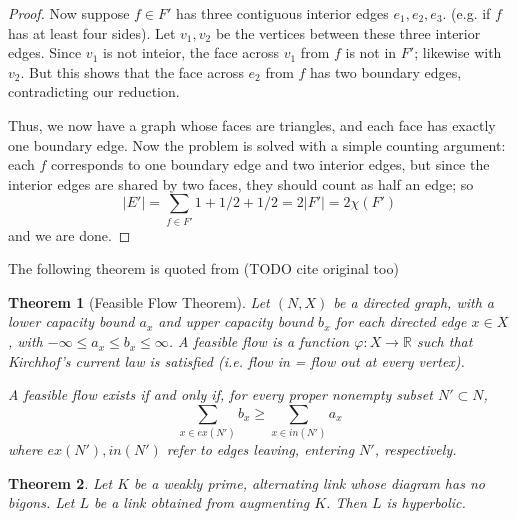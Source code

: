 \documentclass[11pt]{amsart}
\newcommand{\figref}[1]{Figure \ref{#1}}
\newcommand{\RR}{\mathbb{R}}
\newcommand{\vphi}{\varphi}
\theoremstyle{plain}
\newtheorem{theorem}{Theorem}[section]
\theoremstyle{definition}
\begin{document}
\begin{proof}
Now suppose $f\in F'$ has three contiguous interior edges
$e_1,e_2,e_3$.
(e.g. if $f$ has at least four sides).
Let $v_1, v_2$ be the vertices between these three interior edges.
Since $v_1$ is not inteior,
the face across $v_1$ from $f$ is not in $F'$;
likewise with $v_2$.
But this shows that the face across $e_2$ from $f$
has two boundary edges, contradicting our reduction.


Thus, we now have a graph whose faces are triangles,
and each face has exactly one boundary edge.
Now the problem is solved with a simple counting argument:
each $f$ corresponds to one boundary edge and two interior edges,
but since the interior edges are shared by two faces,
they should count as half an edge; so
\[
 |E'| = \sum_{f\in F'} 1 + 1/2 + 1/2 = 2|F'| = 2\chi(F')
\]
and we are done.
\end{proof}


The following theorem is quoted from \cite{BS}
(TODO cite original too)

\begin{theorem}[Feasible Flow Theorem]
\label{t:feasible_flow}
Let $(N,X)$ be a directed graph,
with a \emph{lower capacity bound} $a_x$
and \emph{upper capacity bound} $b_x$
for each directed edge $x \in X$,
with $-\infty \leq a_x \leq b_x \leq \infty$.
A \emph{feasible flow} is a function $\vphi : X \to \RR$
such that Kirchhof's current law is satisfied
(i.e. flow in = flow out at every vertex).

A feasible flow exists if and only if,
for every proper nonempty subset $N' \subset N$,
\[
\sum_{x \in ex(N')} b_x \geq \sum_{x \in in(N')} a_x
\]
where $ex(N'), in(N')$ refer to edges leaving,
entering $N'$, respectively.
\end{theorem}



\begin{theorem}
Let $K$ be a weakly prime, alternating link whose diagram has no bigons.
Let $L$ be a link obtained from augmenting $K$.
Then $L$ is hyperbolic.
\end{theorem}
\end{document}
